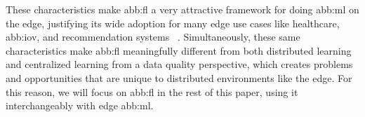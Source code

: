 These characteristics make \gls{abb:fl} a very attractive framework
for doing \gls{abb:ml} on the edge, justifying its wide adoption for many edge use cases
like healthcare, \gls{abb:iov}, and recommendation systems%
~\cite{wangEdgeAIConvergence2020,xiaSurveyFederatedLearning2021}.
Simultaneously, these same characteristics make \gls{abb:fl} meaningfully different
from both distributed learning and centralized learning from a data quality perspective,
which creates problems and opportunities
that are unique to distributed environments like the edge.
For this reason, we will focus on \gls{abb:fl} in the rest of this paper,
using it interchangeably with edge \gls{abb:ml}.
